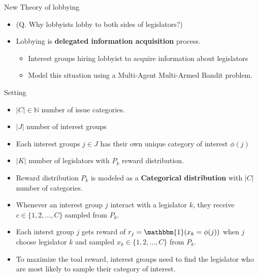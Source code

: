 \documentclass{beamer}
\begin{document}
	\begin{frame}{New Theory of lobbying}
		\fontsize{13pt}{12pt}

		\begin{itemize}
			\item (Q. Why lobbyists lobby to both sides of legislators?)
			\item Lobbying is \textbf{delegated information acquisition} process.
			\begin{itemize}
				\item Interest groups hiring lobbyist to acquire information about legislators
				\item Model this situation using a Multi-Agent Multi-Armed Bandit problem.
			\end{itemize}
		\end{itemize}
	\end{frame}

	\begin{frame}{Setting}
		\begin{itemize}
			\item $|C| \in \mathbb{N}$ number of issue categories.
			\item $|J|$ number of interest groups
			\item Each interest groups $j \in J$ has their own unique category of interest $\phi(j)$
			\item $|K|$ number of legislators with $P_k$ reward distribution.
			\item Reward distribution $P_k$ is modeled as a \textbf{Categorical distribution} 
			with $|C|$ number of categories. 
			\item Whenever an interest group $j$ interact with a legislator $k$, they receive $c \in \{1, 2, \hdots, C\}$ sampled from $P_k$.
			\item Each interst group $j$ gets reward of $r_j = \mathbbm{1}(x_k = \phi(j))$ when $j$ 
			choose legislator $k$ and sampled $x_k \in \{1, 2, \hdots, C\} $ from $P_k$. 
			\item To maximize the toal reward, interest groups need to find the 
			legislator who are most likely to sample their category of interest. 
		\end{itemize}
	\end{frame}
\end{document}
